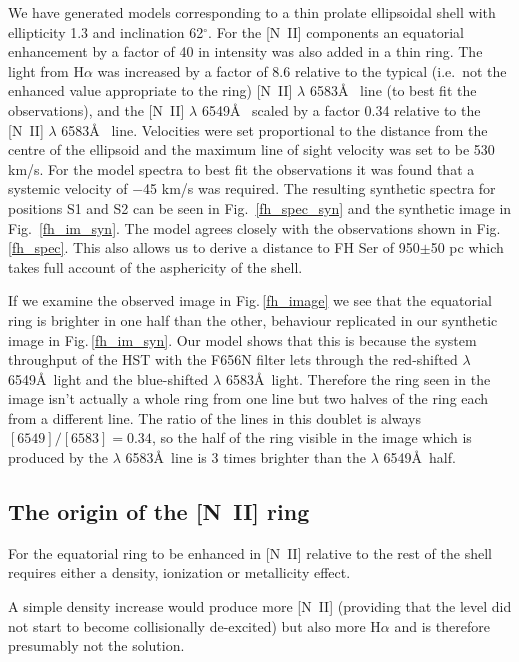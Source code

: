 We have generated models corresponding to a thin prolate ellipsoidal
shell with ellipticity 1.3 and inclination 62$^\circ$. For the
[N~II] components an equatorial enhancement by a factor of 40 in
intensity was also added in a thin ring. The light from H$\alpha$ was
increased by a factor of 8.6 relative to the typical (i.e.\ not the enhanced 
value appropriate to the ring) [N~II] $\lambda$ 6583\AA~
line (to best fit the observations), and the [N~II] $\lambda$ 6549\AA~
scaled by a factor 0.34 relative to the [N~II] $\lambda$ 6583\AA~ line.
Velocities were set proportional to the distance from the centre of the
ellipsoid and the maximum line of sight velocity was set to be 530 km/s.
For the model spectra to best fit the observations it was found that a
systemic velocity of $-$45 km/s was required. The resulting synthetic
spectra for positions S1 and S2 can be seen in 
Fig.~\ref{fh_spec_syn} and the synthetic
image in Fig.~\ref{fh_im_syn}. The model agrees closely with
the observations shown in Fig.\,\ref{fh_spec}. 
This also allows us to derive a distance to FH Ser of 
950$\pm$50 pc which takes full account of the asphericity of the shell.

If we examine the observed image in Fig.\,\ref{fh_image} 
we see that the equatorial ring is 
brighter in one half than the other, behaviour replicated in our synthetic 
image in Fig.\,\ref{fh_im_syn}. Our model shows that this is 
because the system
throughput of the HST with the F656N filter lets through the red-shifted
$\lambda$ 6549\AA~light and the blue-shifted $\lambda$ 6583\AA~light.
Therefore the ring seen in the image isn't actually a whole ring from one
line but two halves of the ring each from a different line.
The ratio of the lines in this doublet is always $[6549]/[6583]=0.34$, so
the half of the ring visible in the image which is 
produced by the $\lambda$ 6583\AA~line is 3 times
brighter than the $\lambda$ 6549\AA~half. 

\subsection{The origin of the [N~II] ring}

For the equatorial ring to be enhanced in [N~II] relative to the rest of
the shell requires either a density, ionization or metallicity effect. 

A simple density increase would produce more [N~II] (providing that the
level did not start to become collisionally de-excited) but also more
H$\alpha$ and is therefore presumably not the solution.

